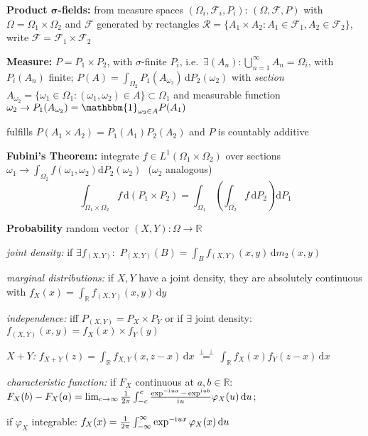 \documentclass[8pt,twoside]{extarticle}
\newcommand{\indep}{\perp \!\!\! \perp}
\newcommand{\compi}{\mathrm{i}\mkern1mu}
\begin{document}
\begin{multicols}{2}
\textbf{Product $\boldsymbol{\sigma}$-fields:} from measure spaces $(\Omega_i,\mathcal{F}_i,P_i)$: $(\Omega, \mathcal{F}, P)$ with $\Omega=\Omega_1 \times \Omega_2$ and $\mathcal{F}$ generated by rectangles $\mathcal{R}=\{A_1\times A_2:A_1\in\mathcal{F}_1,A_2\in \mathcal{F}_2\}$, write $\mathcal{F}=\mathcal{F}_1\times\mathcal{F}_2$

\textbf{Measure:} $P{=}P_1{\times} P_2$, with $\sigma$-finite $P_i$, i.e.\ $\exists (A_n):\bigcup_{n=1}^\infty\! A_n {=} \Omega_{i}$, with $P_i(A_n)$ finite;
$P(A) = \int_{\Omega_2}P_1(A_{\omega_2})\,\mathrm{d}P_2(\omega_2)$
with \textit{section} $A_{\omega_2}=\{\omega_1 \in\Omega_1:(\omega_1,\omega_2)\in A\} \subset \Omega_1$
and measurable function $\omega_2 \to P_1(A_{\omega_2})=\mathbbm{1}_{\omega_2\in A} P(A_1)$ 


fulfills $P(A_1\times A_2)=P_1(A_1)P_2(A_2)$
and $P$ is countably additive
 
 \textbf{Fubini's Theorem:} integrate $f\in L^1(\Omega_1\times\Omega_2)$ over sections 
 $\omega_1\to\int_{\Omega_2}f(\omega_1,\omega_2)\mathrm{d}P_2(\omega_2)$ \,\,($\omega_2$ analogous)
$$\int_{\Omega_1\times\Omega_2}f\,\mathrm{d}(P_1\times P_2) = \int_{\Omega_1}\left( \int_{\Omega_2}f\,\mathrm{d}P_2\right)\mathrm{d}P_1$$ 
 
 
 
 
 \textbf{Probability} random vector $(X,Y):\Omega\to \mathbb{R}$

\textit{joint density:} if $\exists f_{(X,Y)}:$ $P_{(X,Y)}(B) = \int_B f_{(X,Y)}(x,y)\,\mathrm{d}m_2(x,y)$

\textit{marginal distributions:} if $X,Y$ have a joint density, they are absolutely continuous with $f_X(x) = \int_\mathbb{R}f_{(X,Y)}(x,y)\,\mathrm{d}y$

\textit{independence:} iff $P_{(X,Y)}=P_X\times P_Y$ or if $\exists$ joint density: $f_{(X,Y)}(x,y)=f_X(x)\times f_Y(y)$


\textit{$X {+} Y$:} $f_{X+Y}(z)=\int_{\mathbb{R}}f_{X,Y}(x,z{-}x)\,\mathrm{d}x \overset{\indep}{=} \int_{\mathbb{R}}f_{X}(x) f_Y(z{-}x)\,\mathrm{d}x$

\textit{characteristic function:} if $F_X$ continuous at $a,b\in \mathbb{R}:$ $F_X(b)-F_X(a)=\lim_{c\to \infty} \frac{1}{2\pi}\int_{-c}^c \frac{\exp^{-\compi ua}-\exp^{\compi ub}}{\compi u}\varphi_X(u)\,\mathrm{d}u$;

if $\varphi_X$ integrable: $f_X(x) = \frac{1}{2\pi}\int_{-\infty}^\infty \exp^{-\compi ux}\varphi_X(x)\,\mathrm{d}u$




\end{multicols}
\end{document}
